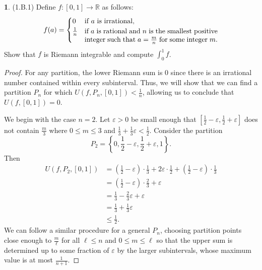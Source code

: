 \documentclass[12pt]{article}
\theoremstyle{definition}
\newtheorem{ex}{}
\begin{document}
\begin{ex}
	(1.B.1)
	Define $f: [0, 1] \to \mathbb{R}$ as follows: \begin{equation*}
		f(a) = \begin{cases}
			0           & \text{if $a$ is irrational},                                                                                                              \\
			\frac{1}{n} & \parbox[t]{.55\textwidth}{if $a$ is rational and $n$ is the smallest positive integer such that $a = \frac{m}{n}$ for some integer $m $.}
		\end{cases}
	\end{equation*}
	Show that $f$ is Riemann integrable and compute $\displaystyle\int_0^1 f$.
\end{ex}
\begin{proof}
	For any partition, the lower Riemann sum is 0 since there is an irrational number contained within every subinterval.
	Thus, we will show that we can find a partition $P_n$ for which $U(f, P_n, [0,1]) < \frac{1}{n}$, allowing us to conclude that $U(f, [0,1]) = 0$.

	We begin with the case $n = 2$.
	Let $\varepsilon > 0$ be small enough that $[\frac{1}{2} - \varepsilon, \frac{1}{2} + \varepsilon]$ does not contain $\frac{m }{3}$ where $0 \leq m \leq 3$ and $\frac{1}{3} + \frac{1}{3}\varepsilon < \frac{1}{2}$.
	Consider the partition \begin{equation*}
		P_2 = \left\lbrace 0, \frac{1}{2} - \varepsilon, \frac{1}{2} + \varepsilon, 1 \right\rbrace.
	\end{equation*}
	Then \begin{align*}
		U(f, P_2, [0, 1]) & = \left( \frac{1}{2} - \varepsilon \right) \cdot \frac{1}{3} + 2\varepsilon \cdot \frac{1}{2} + \left( \frac{1}{2} - \varepsilon \right) \cdot \frac{1}{3} \\
		                  & = \left( \frac{1}{2} - \varepsilon \right) \cdot \frac{2}{3} + \varepsilon                                                                                 \\
		                  & = \frac{1}{3} - \frac{2}{3}\varepsilon + \varepsilon                                                                                                       \\
		                  & = \frac{1}{3} + \frac{1}{3}\varepsilon                                                                                                                     \\
		                  & \leq \frac{1}{2}.
	\end{align*}
	We can follow a similar procedure for a general $P_n$, choosing partition points close enough to $\frac{m }{\ell}$ for all $\ell \leq n$ and $0 \leq m \leq \ell$ so that the upper sum is determined up to some fraction of $\varepsilon$ by the larger subintervals, whose maximum value is at most $\frac{1}{n+1}$.
\end{proof}
\end{document}
